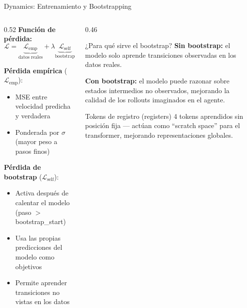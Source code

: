 \documentclass[aspectratio=169, 12pt]{beamer}
\begin{document}
\begin{frame}{Dynamics: Entrenamiento y Bootstrapping}
\begin{columns}[T]
  \begin{column}{0.52\textwidth}
    \textbf{Función de pérdida:}
    \[
      \mathcal{L} = \underbrace{\mathcal{L}_\text{emp}}_{\text{datos reales}} + \lambda \underbrace{\mathcal{L}_\text{self}}_{\text{bootstrap}}
    \]

    \textbf{Pérdida empírica} ($\mathcal{L}_\text{emp}$):
    \begin{itemize}\small
      \item MSE entre velocidad predicha y verdadera
      \item Ponderada por $\sigma$ (mayor peso a pasos finos)
    \end{itemize}

    \vspace{4pt}
    \textbf{Pérdida de bootstrap} ($\mathcal{L}_\text{self}$):
    \begin{itemize}\small
      \item Activa después de calentar el modelo (paso $>$ bootstrap\_start)
      \item Usa las propias predicciones del modelo como objetivos
      \item Permite aprender transiciones no vistas en los datos
    \end{itemize}
  \end{column}
  \begin{column}{0.46\textwidth}
    \begin{exampleblock}{¿Para qué sirve el bootstrap?}
      \textbf{Sin bootstrap:} el modelo solo aprende transiciones observadas en los datos reales.

      \vspace{4pt}
      \textbf{Con bootstrap:} el modelo puede razonar sobre estados intermedios no observados, mejorando la calidad de los rollouts imaginados en el agente.
    \end{exampleblock}

    \vspace{8pt}
    \begin{block}{Tokens de registro (registers)}
      4 tokens aprendidos sin posición fija — actúan como ``scratch space'' para el transformer, mejorando representaciones globales.
    \end{block}
  \end{column}
\end{columns}
\end{frame}
\end{document}
